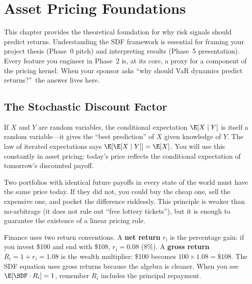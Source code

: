 \chapter{Asset Pricing Foundations}
\label{ch:asset-pricing}

\begin{projectconnection}
This chapter provides the theoretical foundation for why risk signals should predict returns. Understanding the SDF framework is essential for framing your project thesis (Phase~0 pitch) and interpreting results (Phase~5 presentation). Every feature you engineer in Phase~2 is, at its core, a proxy for a component of the pricing kernel. When your sponsor asks ``why should VaR dynamics predict returns?''\ the answer lives here.
\end{projectconnection}

\section{The Stochastic Discount Factor}
\label{sec:sdf}

\begin{prereq}
If $X$ and $Y$ are random variables, the conditional expectation $\E[X \mid Y]$ is itself a random variable---it gives the ``best prediction'' of $X$ given knowledge of $Y$. The law of iterated expectations says $\E[\E[X \mid Y]] = \E[X]$. You will use this constantly in asset pricing: today's price reflects the conditional expectation of tomorrow's discounted payoff.
\end{prereq}

\begin{prereq}
Two portfolios with identical future payoffs in every state of the world must have the same price today. If they did not, you could buy the cheap one, sell the expensive one, and pocket the difference risklessly. This principle is weaker than no-arbitrage (it does not rule out ``free lottery tickets''), but it is enough to guarantee the existence of a linear pricing rule.
\end{prereq}

\begin{prereq}
Finance uses two return conventions. A \textbf{net return} $r_i$ is the percentage gain: if you invest \$100 and end with \$108, $r_i = 0.08$ (8\%). A \textbf{gross return} $R_i = 1 + r_i = 1.08$ is the wealth multiplier: \$100 becomes $100 \times 1.08 = \$108$. The SDF equation uses gross returns because the algebra is cleaner. When you see $\E[\SDF \cdot R_i] = 1$, remember $R_i$ includes the principal repayment.
\end{prereq}

